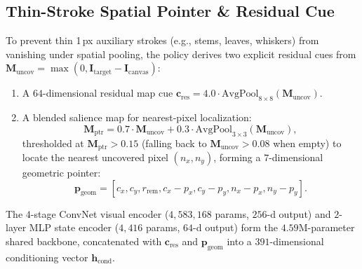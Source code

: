 \documentclass[10pt,twocolumn]{article}
\begin{document}
\subsection{Thin-Stroke Spatial Pointer \& Residual Cue}
To prevent thin 1\,px auxiliary strokes (e.g., stems, leaves, whiskers) from vanishing under spatial pooling, the policy derives two explicit residual cues from $\mathbf{M}_{\text{uncov}} = \max(0, \mathbf{I}_{\text{target}} - \mathbf{I}_{\text{canvas}})$:
\begin{enumerate}
    \item A $64$-dimensional residual map cue $\mathbf{c}_{\text{res}} = 4.0 \cdot \text{AvgPool}_{8\times 8}(\mathbf{M}_{\text{uncov}})$.
    \item A blended salience map for nearest-pixel localization:
    \begin{equation}
        \mathbf{M}_{\text{ptr}} = 0.7 \cdot \mathbf{M}_{\text{uncov}} + 0.3 \cdot \text{AvgPool}_{3\times 3}(\mathbf{M}_{\text{uncov}}),
    \end{equation}
    thresholded at $\mathbf{M}_{\text{ptr}} > 0.15$ (falling back to $\mathbf{M}_{\text{uncov}} > 0.08$ when empty) to locate the nearest uncovered pixel $(n_x, n_y)$, forming a $7$-dimensional geometric pointer:
    \begin{equation*}
        \mathbf{p}_{\text{geom}} = [c_x, c_y, r_{\text{rem}}, c_x - p_x, c_y - p_y, n_x - p_x, n_y - p_y].
    \end{equation*}
\end{enumerate}
The $4$-stage ConvNet visual encoder ($4{,}583{,}168$ params, $256$-d output) and $2$-layer MLP state encoder ($4{,}416$ params, $64$-d output) form the $4.59\text{M}$-parameter shared backbone, concatenated with $\mathbf{c}_{\text{res}}$ and $\mathbf{p}_{\text{geom}}$ into a $391$-dimensional conditioning vector $\mathbf{h}_{\text{cond}}$.
\end{document}
